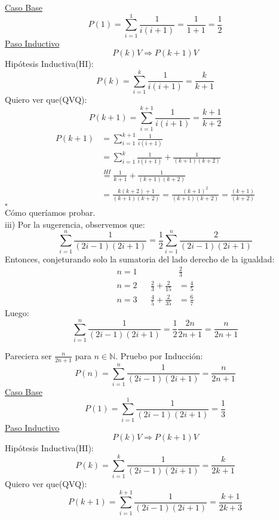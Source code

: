 \documentclass[a4paper,11pt]{article}
\begin{document}
\underline{Caso Base}\\
\[ P(1) = \sum_{i=1}^{1} \frac{1}{i(i+1)} = \frac{1}{1+1} = \frac{1}{2} \]
\underline{Paso Inductivo}\\
\[P(k) V \Rightarrow P(k+1) V\]
Hipótesis Inductiva(HI):\[ P(k) = \sum_{i=1}^{k} \frac{1}{i(i+1)} = \frac{k}{k+1} \]
Quiero ver que(QVQ):\[ P(k+1) = \sum_{i=1}^{k+1} \frac{1}{i(i+1)} = \frac{k+1}{k+2} \]
\begin{equation}
\begin{split}
P(k+1) & = \sum_{i=1}^{k+1} \frac{1}{i(i+1)}  \\
 & = \sum_{i=1}^{k} \frac{1}{i(i+1)} + \frac{1}{(k+1)(k+2)} \\
 & \stackrel{HI}{=} \frac{1}{k+1} + \frac{1}{(k+1)(k+2)} \\
 & = \frac{k(k+2)+1}{(k+1)(k+2)} = \frac{(k+1)^2}{(k+1)(k+2)} = \frac{(k+1)}{(k+2)} 
\end{split}
\end{equation}
\hfill$\square $\\
Cómo queríamos probar.\\

iii) Por la sugerencia, observemos que:
\[\sum_{i=1}^{n} \frac{1}{(2i-1)(2i+1)} = \frac{1}{2} \sum_{i=1}^{n} \frac{2}{(2i-1)(2i+1)} \]
Entonces, conjeturando solo la sumatoria del lado derecho de la igualdad:\\
\begin{align*}
n=1           &           &  & \frac{2}{3}\\
n=2           &     	  &  \frac{2}{3}+\frac{2}{15}&=\frac{4}{5}\\
n=3           &           &  \frac{4}{5}+\frac{2}{35}&=\frac{6}{7}
\end{align*}
Luego:
\[\sum_{i=1}^{n} \frac{1}{(2i-1)(2i+1)} = \frac{1}{2}  \frac{2n}{2n+1} = \frac{n}{2n+1}  \]

Pareciera ser $\frac{n}{2n+1}$ para $n \in \mathbb{N}$. Pruebo por Inducción:\\
\[ P(n) = \sum_{i=1}^{n} \frac{1}{(2i-1)(2i+1)} = \frac{n}{2n+1} \]
\underline{Caso Base}\\
\[ P(1) = \sum_{i=1}^{1} \frac{1}{(2i-1)(2i+1)} = \frac{1}{3} \]
\underline{Paso Inductivo}\\
\[P(k) V \Rightarrow P(k+1) V\]
Hipótesis Inductiva(HI):\[ P(k) = \sum_{i=1}^{k} \frac{1}{(2i-1)(2i+1)} = \frac{k}{2k+1} \]
Quiero ver que(QVQ):\[ P(k+1) = \sum_{i=1}^{k+1} \frac{1}{(2i-1)(2i+1)} = \frac{k+1}{2k+3} \]
\end{document}
